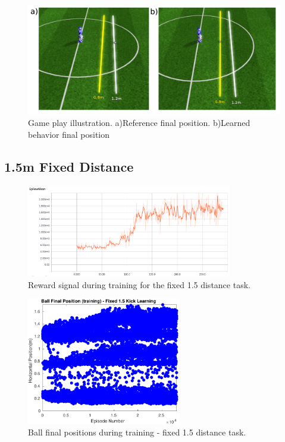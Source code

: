 \begin{figure}[H]
    \centering
    \includegraphics[width=1.0\textwidth]{Chapter7/figures/kick_train_08.pdf} 
    \caption{Game play illustration. a)Reference final position. b)Learned behavior final position}
    \label{fig:RL_08_kick_roboviz}
\end{figure}

\subsection{1.5m Fixed Distance}

\begin{figure}[H]
    \centering
    \includegraphics[width=0.8\textwidth]{Chapter7/figures/rew_mean_fix_15.png} 
    \caption{Reward signal during training for the fixed 1.5 distance task.}
    \label{fig:RL_15_kick}
\end{figure}

\begin{figure}[H]
    \centering
    \includegraphics[width=0.6\textwidth]{Chapter7/plots/plot_ball_pos_15fix_kick_train.pdf} 
    \caption{Ball final positions during training - fixed 1.5 distance task.}
    \label{fig:RL_15_kick_pos_train}
\end{figure}

